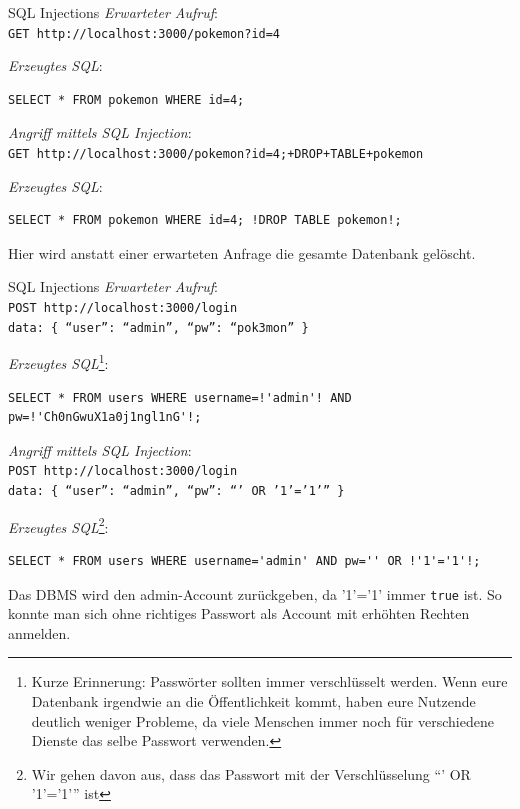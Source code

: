 \begin{example}{SQL Injections}
    \emph{Erwarteter Aufruf}: \\
    \texttt{GET http://localhost:3000/pokemon?id=4}

    \emph{Erzeugtes SQL}:
    \begin{lstlisting}[language=mysql]
        SELECT * FROM pokemon WHERE id=4;
    \end{lstlisting}

    \emph{Angriff mittels SQL Injection}: \\
    \texttt{GET http://localhost:3000/pokemon?id=4;+DROP+TABLE+pokemon}

    \emph{Erzeugtes SQL}:
    \begin{lstlisting}[language=mysql]
        SELECT * FROM pokemon WHERE id=4; !DROP TABLE pokemon!;
    \end{lstlisting}

    Hier wird anstatt einer erwarteten Anfrage die gesamte Datenbank gelöscht.
\end{example}

\begin{example}{SQL Injections}
    \emph{Erwarteter Aufruf}: \\
    \texttt{POST http://localhost:3000/login} \\
    \texttt{data: \{ \enquote{user}: \enquote{admin}, \enquote{pw}: \enquote{pok3mon} \}}

    \emph{Erzeugtes SQL}\footnote{
        Kurze Erinnerung: Passwörter sollten immer verschlüsselt werden.
        Wenn eure Datenbank irgendwie an die Öffentlichkeit kommt, haben eure Nutzende deutlich weniger Probleme, da viele Menschen immer noch für verschiedene Dienste das selbe Passwort verwenden.
    }:
    \begin{lstlisting}[language=mysql]
        SELECT * FROM users WHERE username=!'admin'! AND pw=!'Ch0nGwuX1a0j1ngl1nG'!;
    \end{lstlisting}

    \emph{Angriff mittels SQL Injection}: \\
    \texttt{POST http://localhost:3000/login} \\
    \texttt{data: \{ \enquote{user}: \enquote{admin}, \enquote{pw}: \enquote{' OR '1'='1'} \}}

    \emph{Erzeugtes SQL}\footnote{Wir gehen davon aus, dass das Passwort mit der Verschlüsselung \enquote{' OR '1'='1'} ist}:
    \begin{lstlisting}[language=mysql]
        SELECT * FROM users WHERE username='admin' AND pw='' OR !'1'='1'!;
    \end{lstlisting}

    Das DBMS wird den admin-Account zurückgeben, da '1'='1' immer \texttt{true} ist.
    So konnte man sich ohne richtiges Passwort als Account mit erhöhten Rechten anmelden.
\end{example}

